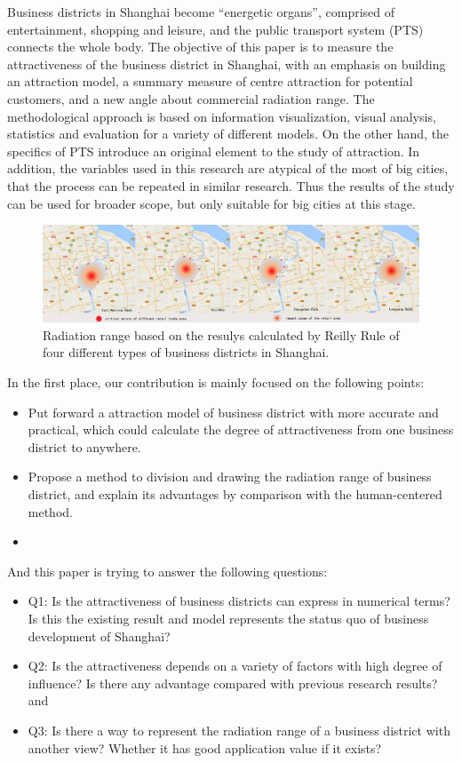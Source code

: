 \documentclass[journal,transmag]{IEEEtran}
\begin{document}
Business districts in Shanghai become ``energetic organs'', comprised of entertainment, shopping and leisure, and the public transport system (PTS) connects the whole body. The objective of this paper is to measure the attractiveness of the business district in Shanghai, with an emphasis on building an attraction model, a summary measure of centre attraction for potential customers, and a new angle about commercial radiation range. The methodological approach is based on information visualization, visual analysis, statistics and evaluation for a variety of different models. On the other hand, the specifics of PTS introduce an original element to the study of attraction. In addition, the variables used in this research are atypical of the most of big cities, that the process can be repeated in similar research. Thus the results of the study can be used for broader scope, but only suitable for big cities at this stage.

\begin{figure}[tb]
\centering
\includegraphics[width=1.9\columnwidth]{figure1.png}
\caption{Radiation range based on the resulys calculated by Reilly Rule of four different types of business districts in Shanghai.}
\label{fig:Reilly-range}
\end{figure}

In the first place, our contribution is mainly focused on the following points:

\begin{itemize}
\item Put forward a attraction model of business district with more accurate and practical, which could calculate the degree of attractiveness from one business district to anywhere.
\item Propose a method to division and drawing the radiation range of business district, and explain its advantages by comparison with the human-centered method.
\item 
\end{itemize}

And this paper is trying to answer the following questions:
\begin{itemize}
\item Q1: Is the attractiveness of business districts can express in numerical terms? Is this the existing result and model represents the status quo of business development of Shanghai?
\item Q2: Is the attractiveness depends on a variety of factors with high degree of influence? Is there any advantage compared with previous research results? and
\item Q3: Is there a way to represent the radiation range of a business district with another view? Whether it has good application value if it exists?
\end{itemize}
\end{document}
